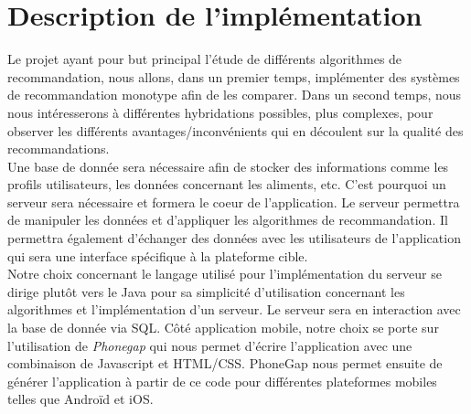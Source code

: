 \documentclass[a4paper, 11pt]{article}
\begin{document}
\section{Description de l'implémentation}
Le projet ayant pour but principal l'étude de différents algorithmes de recommandation, nous allons, dans un premier temps, implémenter des systèmes de recommandation monotype afin de les comparer. Dans un second temps, nous nous intéresserons à différentes hybridations possibles, plus complexes, pour observer les différents avantages/inconvénients qui en découlent sur la qualité des recommandations.\\[0.2cm]
Une base de donnée sera nécessaire afin de stocker des informations comme les profils utilisateurs, les données concernant les aliments, etc. C'est pourquoi un serveur sera nécessaire et formera le coeur de l'application. Le serveur permettra de manipuler les données et d'appliquer les algorithmes de recommandation. Il permettra également d'échanger des données avec les utilisateurs de l'application qui sera une interface spécifique à la plateforme cible.\\[0.2cm]
Notre choix concernant le langage utilisé pour l'implémentation du serveur se dirige plutôt vers le Java pour sa simplicité d'utilisation concernant les algorithmes et l'implémentation d'un serveur. Le serveur sera en interaction avec la base de donnée via SQL. Côté application mobile, notre choix se porte sur l'utilisation de \textit{Phonegap} qui nous permet d'écrire l'application avec une combinaison de Javascript et HTML/CSS. PhoneGap nous permet ensuite de générer l'application à partir de ce code pour différentes plateformes mobiles telles que Androïd et iOS.
\end{document}
